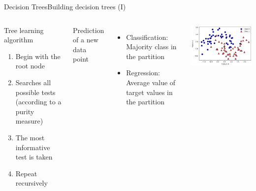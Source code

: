 \documentclass[10pt,compress]{beamer} %
\begin{document}
\begin{frame}{Decision Trees}{Building decision trees (I)}
    \begin{columns}

            \begin{block}{Tree learning algorithm}
                \begin{enumerate}
                    \item Begin with the root node
                    \item Searches all possible tests (according to a purity measure)
                    \item The most informative test is taken
                    \item Repeat recursively
                \end{enumerate}
            \end{block}
            Prediction of a new data point
            \begin{itemize}
                \item Classification: Majority class in the partition
                \item Regression: Average value of target values in the partition
            \end{itemize}
            \centering \includegraphics[width=\linewidth]{figs/tree-example.png}
    \end{columns}
\end{frame}
\end{document}
